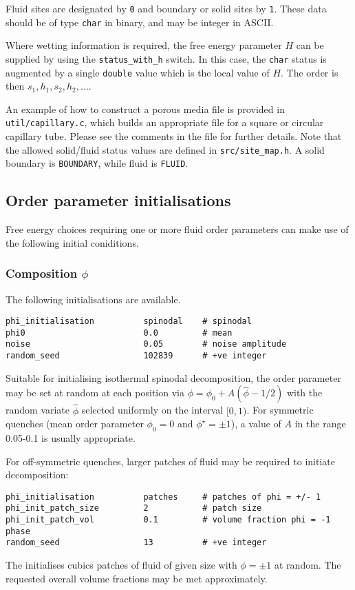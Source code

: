 Fluid sites are designated by \texttt{0} and boundary or solid sites
by \texttt{1}. These data should be of type \texttt{char} in binary,
and may be integer in ASCII.

Where wetting information is required, the free energy parameter $H$
can be supplied by using the \texttt{status\_with\_h} switch. In this
case, the \texttt{char} status is augmented by a single \texttt{double}
value which is the local value of $H$. The order is then
$s_1,h_1, s_2, h_2, \ldots$.

An example of how to construct a porous media file is provided in
\texttt{util/capillary.c}, which builds an appropriate file for
a square or circular capillary tube. Please see the comments in
the file for further details. Note that the allowed
solid/fluid status values are defined in \texttt{src/site\_map.h}.
A solid boundary is \texttt{BOUNDARY}, while fluid is \texttt{FLUID}.



\subsection{Order parameter initialisations}

Free energy choices requiring one or more fluid order parameters can make
use of the following initial coniditions.

\subsubsection{Composition $\phi$}

The following initialisations are available.
\begin{lstlisting}
phi_initialisation          spinodal    # spinodal
phi0                        0.0         # mean
noise                       0.05        # noise amplitude
random_seed                 102839      # +ve integer
\end{lstlisting}
Suitable for initialising isothermal spinodal decomposition, the order
parameter may be set at random at each position via
$\phi = \phi_0 + A(\hat{\phi} - 1/2)$ with the random variate
$\hat\phi$ selected uniformly on the interval $[0,1)$. For symmetric
quenches (mean order parameter $\phi_0 = 0$ and $\phi^\star = \pm 1$),
a value of $A$ in the range 0.05-0.1 is usually appropriate.

For off-symmetric quenches, larger patches of fluid may be required to
initiate decomposition:
\begin{lstlisting}
phi_initialisation          patches     # patches of phi = +/- 1
phi_init_patch_size         2           # patch size
phi_init_patch_vol          0.1         # volume fraction phi = -1 phase
random_seed                 13          # +ve integer
\end{lstlisting}
The initialises cubics patches of fluid of given size with $\phi= \pm 1$
at random. The requested overall volume fractions may be met approximately.

